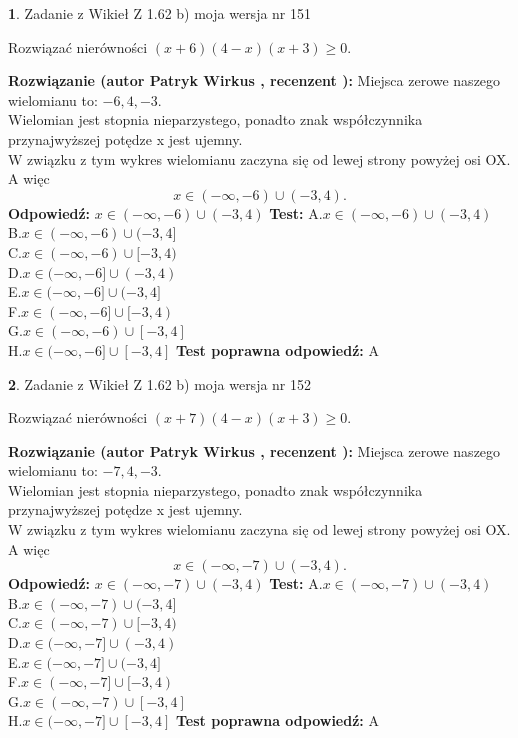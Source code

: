\documentclass[12pt, a4paper]{article}
\theoremstyle{definition} %
\newtheorem{zad}{}
\newcommand{\zadStart}[1]{\begin{zad}#1\newline}
\newcommand{\zadStop}{\end{zad}}
\newcommand{\rozwStart}[2]{\noindent \textbf{Rozwiązanie (autor #1 , recenzent #2): }\newline}
\newcommand{\rozwStop}{\newline}
\newcommand{\odpStart}{\noindent \textbf{Odpowiedź:}\newline}
\newcommand{\odpStop}{\newline}
\newcommand{\testStart}{\noindent \textbf{Test:}\newline}
\newcommand{\testStop}{\newline}
\newcommand{\kluczStart}{\noindent \textbf{Test poprawna odpowiedź:}\newline}
\newcommand{\kluczStop}{\newline}
\begin{document}
\zadStart{Zadanie z Wikieł Z 1.62 b) moja wersja nr 151}

Rozwiązać nierówności $(x+6)(4-x)(x+3)\ge0$.
\zadStop
\rozwStart{Patryk Wirkus}{}
Miejsca zerowe naszego wielomianu to: $-6, 4, -3$.\\
Wielomian jest stopnia nieparzystego, ponadto znak współczynnika przy\linebreak najwyższej potędze x jest ujemny.\\ W związku z tym wykres wielomianu zaczyna się od lewej strony powyżej osi OX. A więc $$x \in (-\infty,-6) \cup (-3,4).$$
\rozwStop
\odpStart
$x \in (-\infty,-6) \cup (-3,4)$
\odpStop
\testStart
A.$x \in (-\infty,-6) \cup (-3,4)$\\
B.$x \in (-\infty,-6) \cup (-3,4]$\\
C.$x \in (-\infty,-6) \cup [-3,4)$\\
D.$x \in (-\infty,-6] \cup (-3,4)$\\
E.$x \in (-\infty,-6] \cup (-3,4]$\\
F.$x \in (-\infty,-6] \cup [-3,4)$\\
G.$x \in (-\infty,-6) \cup [-3,4]$\\
H.$x \in (-\infty,-6] \cup [-3,4]$
\testStop
\kluczStart
A
\kluczStop



\zadStart{Zadanie z Wikieł Z 1.62 b) moja wersja nr 152}

Rozwiązać nierówności $(x+7)(4-x)(x+3)\ge0$.
\zadStop
\rozwStart{Patryk Wirkus}{}
Miejsca zerowe naszego wielomianu to: $-7, 4, -3$.\\
Wielomian jest stopnia nieparzystego, ponadto znak współczynnika przy\linebreak najwyższej potędze x jest ujemny.\\ W związku z tym wykres wielomianu zaczyna się od lewej strony powyżej osi OX. A więc $$x \in (-\infty,-7) \cup (-3,4).$$
\rozwStop
\odpStart
$x \in (-\infty,-7) \cup (-3,4)$
\odpStop
\testStart
A.$x \in (-\infty,-7) \cup (-3,4)$\\
B.$x \in (-\infty,-7) \cup (-3,4]$\\
C.$x \in (-\infty,-7) \cup [-3,4)$\\
D.$x \in (-\infty,-7] \cup (-3,4)$\\
E.$x \in (-\infty,-7] \cup (-3,4]$\\
F.$x \in (-\infty,-7] \cup [-3,4)$\\
G.$x \in (-\infty,-7) \cup [-3,4]$\\
H.$x \in (-\infty,-7] \cup [-3,4]$
\testStop
\kluczStart
A
\kluczStop
\end{document}

